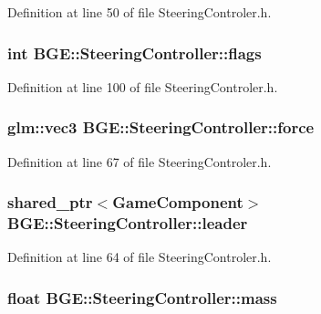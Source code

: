 Definition at line 50 of file Steering\-Controler.\-h.

\hypertarget{class_b_g_e_1_1_steering_controller_a8e3bba21f8c3f425b6a591b9c85d9c90}{
\subsubsection[{flags}]{\setlength{\rightskip}{0pt plus 5cm}int B\-G\-E\-::\-Steering\-Controller\-::flags}}\label{class_b_g_e_1_1_steering_controller_a8e3bba21f8c3f425b6a591b9c85d9c90}


Definition at line 100 of file Steering\-Controler.\-h.

\hypertarget{class_b_g_e_1_1_steering_controller_ad10b3de08abf1b1d18b72628012fd011}{
\subsubsection[{force}]{\setlength{\rightskip}{0pt plus 5cm}glm\-::vec3 B\-G\-E\-::\-Steering\-Controller\-::force}}\label{class_b_g_e_1_1_steering_controller_ad10b3de08abf1b1d18b72628012fd011}


Definition at line 67 of file Steering\-Controler.\-h.

\hypertarget{class_b_g_e_1_1_steering_controller_a903b58bdfc1ffa2da91a0cb4e86709cd}{
\subsubsection[{leader}]{\setlength{\rightskip}{0pt plus 5cm}shared\-\_\-ptr$<${\bf Game\-Component}$>$ B\-G\-E\-::\-Steering\-Controller\-::leader}}\label{class_b_g_e_1_1_steering_controller_a903b58bdfc1ffa2da91a0cb4e86709cd}


Definition at line 64 of file Steering\-Controler.\-h.

\hypertarget{class_b_g_e_1_1_steering_controller_aef56ff8322c205106e1fda10a7a6163a}{
\subsubsection[{mass}]{\setlength{\rightskip}{0pt plus 5cm}float B\-G\-E\-::\-Steering\-Controller\-::mass}}\label{class_b_g_e_1_1_steering_controller_aef56ff8322c205106e1fda10a7a6163a}


